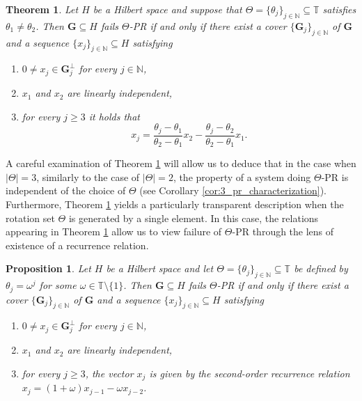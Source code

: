 \documentclass[reqno,a4paper,11pt]{amsart}
\numberwithin{equation}{section}
\newtheorem{theorem}[definition]{Theorem}
\newtheorem{proposition}[definition]{Proposition}
\def\N{{\mathbb N}}
\def\T{{\mathbb T}}
\newcommand\1{\mathds{1}}
\begin{document}
\begin{theorem}\label{thm:m1}
   Let $H$ be a Hilbert space and suppose that $\Theta=\{\theta_j\}_{j \in \N}\subseteq \T$ satisfies $\theta_1\neq \theta_2$. Then $\mathbf{G} \subseteq H$ fails $\Theta$-PR if and only if there exist a cover $\{\mathbf{G}_j\}_{j \in \N}$ of $\mathbf{G}$ and a sequence $\{ x_j \}_{j \in \N} \subseteq H$ satisfying
    \begin{enumerate}
        \item $0 \neq x_j \in \mathbf{G}_j^\perp$ for every $j\in \N$,
        \item $x_1$ and $x_2$ are linearly independent,
        \item for every $j \geq 3$ it holds that
        $$x_j = \frac{\theta_j-\theta_1}{\theta_2-\theta_1}x_2 - \frac{\theta_j-\theta_2}{\theta_2-\theta_1}x_1.$$
    \end{enumerate} 
\end{theorem}

A careful examination of Theorem \ref{thm:m1} will allow us to deduce that in the case when $|\Theta|=3$, similarly to the case of $|\Theta| = 2$, the property of a system doing $\Theta$-PR is independent of the choice of $\Theta$ (see Corollary \ref{cor:3_pr_characterization}). Furthermore, Theorem \ref{thm:m1} yields a particularly transparent description when the rotation set $\Theta$ is generated by a single element. In this case, the relations appearing in Theorem \ref{thm:m1} allow us to view failure of $\Theta$-PR through the lens of existence of a recurrence relation.

\begin{proposition}\label{prop:recurrence}
Let $H$ be a Hilbert space and let $\Theta=\{\theta_j\}_{j \in \N} \subseteq \T$ be defined by $\theta_j=\omega^j$ for some $\omega \in \T\setminus\{1\}$. Then $\mathbf{G} \subseteq H$ fails $\Theta$-PR if and only if there exist a cover $\{\mathbf{G}_j\}_{j \in \N}$ of $\mathbf{G}$ and a sequence $\{ x_j \}_{j \in \N} \subseteq H$ satisfying
\begin{enumerate}
        \item $0 \neq x_j \in \mathbf{G}_j^\perp$ for every $j\in \N$,
        \item $x_1$ and $x_2$ are linearly independent,
        \item for every $j \geq 3$, the vector $x_j$ is given by the second-order recurrence relation $x_j = (1+\omega)x_{j-1} - \omega x_{j-2}$.
    \end{enumerate}
\end{proposition}
\end{document}
